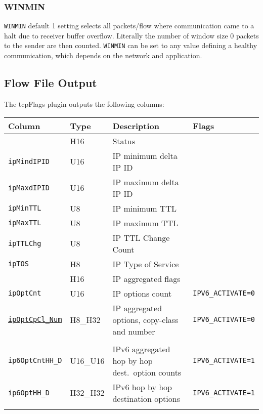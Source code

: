\documentclass[documentation]{subfiles}
\begin{document}
\subsubsection{WINMIN}\label{WINMIN}
{\tt WINMIN} default 1 setting selects all packets/flow where communication came to a halt due to receiver buffer overflow.
Literally the number of window size 0 packets to the sender are then counted. {\tt WINMIN} can be set to any value defining
a healthy communication, which depends on the network and application.

\subsection{Flow File Output}
The tcpFlags plugin outputs the following columns:
\begin{longtable}{llll}
    \toprule
    {\bf Column} & {\bf Type} & {\bf Description} & {\bf Flags}\\
    \midrule\endhead%
    {\tt \nameref{tcpFStat}} & H16 & Status\\
    {\tt ipMindIPID}         & U16 & IP minimum delta IP ID \\
    {\tt ipMaxdIPID}         & U16 & IP maximum delta IP ID\\
    {\tt ipMinTTL}           & U8  & IP minimum TTL\\
    {\tt ipMaxTTL}           & U8  & IP maximum TTL\\
    {\tt ipTTLChg}           & U8  & IP TTL Change Count\\
    {\tt ipTOS}              & H8  & IP Type of Service\\
    {\tt \nameref{ipFlags}}  & H16 & IP aggregated flags\\
    {\tt ipOptCnt} & U16 & IP options count & {\tt IPV6\_ACTIVATE=0}\\
    {\tt \hyperref[ipOptCpClNum]{ipOptCpCl\_Num}} & H8\_H32 & IP aggregated options, copy-class and number & {\tt IPV6\_ACTIVATE=0}\\\\
    {\tt ip6OptCntHH\_D} & U16\_U16 & IPv6 aggregated hop by hop dest.\ option counts & {\tt IPV6\_ACTIVATE=1}\\
    {\tt ip6OptHH\_D} & H32\_H32 & IPv6 hop by hop destination options & {\tt IPV6\_ACTIVATE=1}\\\\



\end{longtable}
\end{document}
